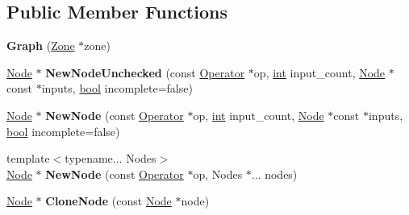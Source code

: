 \subsection*{Public Member Functions}
\begin{DoxyCompactItemize}
\item 
\mbox{\label{classv8_1_1internal_1_1compiler_1_1Graph_ad50e52f7e457ee8d9ee48822e54dcff7}} 
{\bfseries Graph} (\mbox{\hyperlink{classv8_1_1internal_1_1Zone}{Zone}} $\ast$zone)
\item 
\mbox{\label{classv8_1_1internal_1_1compiler_1_1Graph_ac96b63d8f7e19cce02ab93f534e0ce27}} 
\mbox{\hyperlink{classv8_1_1internal_1_1compiler_1_1Node}{Node}} $\ast$ {\bfseries New\+Node\+Unchecked} (const \mbox{\hyperlink{classv8_1_1internal_1_1compiler_1_1Operator}{Operator}} $\ast$op, \mbox{\hyperlink{classint}{int}} input\+\_\+count, \mbox{\hyperlink{classv8_1_1internal_1_1compiler_1_1Node}{Node}} $\ast$const $\ast$inputs, \mbox{\hyperlink{classbool}{bool}} incomplete=false)
\item 
\mbox{\label{classv8_1_1internal_1_1compiler_1_1Graph_ad2588802d0525353a979dc8679f2a84e}} 
\mbox{\hyperlink{classv8_1_1internal_1_1compiler_1_1Node}{Node}} $\ast$ {\bfseries New\+Node} (const \mbox{\hyperlink{classv8_1_1internal_1_1compiler_1_1Operator}{Operator}} $\ast$op, \mbox{\hyperlink{classint}{int}} input\+\_\+count, \mbox{\hyperlink{classv8_1_1internal_1_1compiler_1_1Node}{Node}} $\ast$const $\ast$inputs, \mbox{\hyperlink{classbool}{bool}} incomplete=false)
\item 
\mbox{\label{classv8_1_1internal_1_1compiler_1_1Graph_a06799ffbfc6abc71418468112e622d3d}} 
{\footnotesize template$<$typename... Nodes$>$ }\\\mbox{\hyperlink{classv8_1_1internal_1_1compiler_1_1Node}{Node}} $\ast$ {\bfseries New\+Node} (const \mbox{\hyperlink{classv8_1_1internal_1_1compiler_1_1Operator}{Operator}} $\ast$op, Nodes $\ast$... nodes)
\item 
\mbox{\label{classv8_1_1internal_1_1compiler_1_1Graph_a88ce3760d278b92aa6ce3e356af380f3}} 
\mbox{\hyperlink{classv8_1_1internal_1_1compiler_1_1Node}{Node}} $\ast$ {\bfseries Clone\+Node} (const \mbox{\hyperlink{classv8_1_1internal_1_1compiler_1_1Node}{Node}} $\ast$node)

\end{DoxyCompactItemize}
